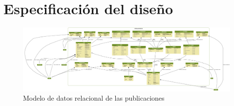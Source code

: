 \chapter{Especificación del diseño}

\begin{figure}[!htbp]
	\centering
	\includegraphics[angle=-90, scale=0.17]{fig/dbmodel/publications}
	\caption{Modelo de datos relacional de las publicaciones}
	\label{fig:publicationsmodel}
\end{figure}